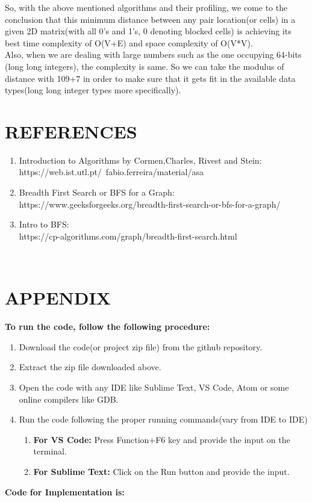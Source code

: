 \documentclass[10pt]{article}
\begin{document}
\begin{multicols*}{2}
So, with the above mentioned algorithms and their profiling, we come to the conclusion that this minimum  distance between any pair location(or cells) in a given 2D matrix(with all 0’s and 1’s, 0 denoting blocked cells)  is achieving its best time complexity of O(V+E) and space complexity of O(V*V).\\Also, when we are dealing with large numbers such as the one occupying 64-bits (long long integers), the complexity is same. So we can take the modulus of distance with 109+7 in order to make sure that it gets fit in the available data types(long long integer types more specifically).


\section*{REFERENCES}

\begin{enumerate}
\item Introduction to Algorithms by Cormen,Charles, Rivest and Stein:\\
https://web.ist.utl.pt/~fabio.ferreira/material/asa
\item Breadth First Search or BFS for a Graph:\\
https://www.geeksforgeeks.org/breadth-first-search-or-bfs-for-a-graph/
\item Intro to BFS:\\
https://cp-algorithms.com/graph/breadth-first-search.html
\end{enumerate}\\

\section*{APPENDIX}
\textbf{To run the code, follow the following procedure:}
\begin{enumerate}
    \item Download the code(or project zip file) from the github repository.
    \item Extract the zip file downloaded above.
    \item Open the code with any IDE like Sublime Text, VS Code, Atom or some online compilers like GDB.
    \item Run the code following the proper running commands(vary from IDE to IDE)
    \begin{enumerate}
        \item \textbf{For VS Code:} Press Function+F6 key and provide the input on the terminal.
        \item \textbf{For Sublime Text:} Click on the Run button and provide the input.\\
    \end{enumerate}
\end{enumerate}
\textbf{Code for Implementation is:}


\end{multicols*}
\end{document}
